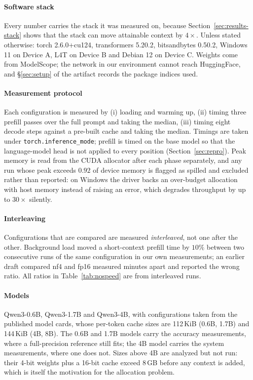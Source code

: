 \documentclass[10pt,journal]{IEEEtran}
\begin{document}
\paragraph*{Software stack}
Every number carries the stack it was measured on, because
Section~\ref{sec:results-stack} shows that the stack can move attainable context
by $4\times$. Unless stated otherwise: torch 2.6.0+cu124, transformers 5.20.2,
bitsandbytes 0.50.2, Windows 11 on Device A, L4T on Device B and Debian 12 on
Device C. Weights come
from ModelScope; the network in our environment cannot reach HuggingFace, and
\S\ref{sec:setup} of the artifact records the package indices used.

\paragraph*{Measurement protocol}
Each configuration is measured by (i) loading and warming up, (ii) timing three
prefill passes over the full prompt and taking the median, (iii) timing eight
decode steps against a pre-built cache and taking the median. Timings are taken
under \texttt{torch.inference\_mode}; prefill is timed on the base model so that
the language-model head is not applied to every position
(Section~\ref{sec:repro}). Peak memory is read from the CUDA allocator after each
phase separately, and any run whose peak exceeds $0.92$ of device memory is
flagged as spilled and excluded rather than reported: on Windows the driver backs
an over-budget allocation with host memory instead of raising an error, which
degrades throughput by up to $30\times$ silently.

\paragraph*{Interleaving}
Configurations that are compared are measured \emph{interleaved}, not one after
the other. Background load moved a short-context prefill time by $10\%$ between
two consecutive runs of the same configuration in our own measurements; an
earlier draft compared nf4 and fp16 measured minutes apart and reported the
wrong ratio. All ratios in Table~\ref{tab:nospeed} are from interleaved runs.

\paragraph*{Models}
Qwen3-0.6B, Qwen3-1.7B and Qwen3-4B, with configurations taken from the
published model cards, whose per-token cache sizes are 112\,KiB (0.6B, 1.7B) and 144\,KiB (4B, 8B). The 0.6B and 1.7B models carry
the accuracy measurements, where a full-precision reference still fits; the 4B
model carries the system measurements, where one does not. Sizes above 4B are
analyzed but not run: their 4-bit weights plus a 16-bit cache exceed 8\,GB
before any context is added, which is itself the motivation for the allocation
problem.
\end{document}
